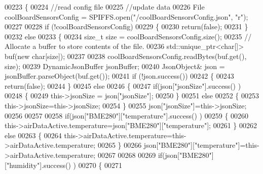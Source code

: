 \begin{DoxyCode}
00223 \{
00224     \textcolor{comment}{//read config file}
00225     \textcolor{comment}{//update data}
00226     File coolBoardSensorsConfig = SPIFFS.open(\textcolor{stringliteral}{"/coolBoardSensorsConfig.json"}, \textcolor{stringliteral}{"r"});
00227 
00228     \textcolor{keywordflow}{if} (!coolBoardSensorsConfig) 
00229     \{
00230         \textcolor{keywordflow}{return}(\textcolor{keyword}{false});
00231     \}
00232     \textcolor{keywordflow}{else}
00233     \{
00234         \textcolor{keywordtype}{size\_t} size = coolBoardSensorsConfig.size();
00235         \textcolor{comment}{// Allocate a buffer to store contents of the file.}
00236         std::unique\_ptr<char[]> buf(\textcolor{keyword}{new} \textcolor{keywordtype}{char}[size]);
00237 
00238         coolBoardSensorsConfig.readBytes(buf.get(), size);
00239         DynamicJsonBuffer jsonBuffer;
00240         JsonObject& json = jsonBuffer.parseObject(buf.get());
00241         \textcolor{keywordflow}{if} (!json.success()) 
00242         \{
00243               \textcolor{keywordflow}{return}(\textcolor{keyword}{false});
00244         \} 
00245         \textcolor{keywordflow}{else}
00246         \{     
00247             \textcolor{keywordflow}{if}(json[\textcolor{stringliteral}{"jsonSize"}].success() )
00248             \{
00249                 this->jsonSize = json[\textcolor{stringliteral}{"jsonSize"}]; 
00250             \}
00251             \textcolor{keywordflow}{else}
00252             \{
00253                 this->jsonSize=this->jsonSize;          
00254             \}
00255             json[\textcolor{stringliteral}{"jsonSize"}]=this->jsonSize;
00256 
00257             
00258             \textcolor{keywordflow}{if}(json[\textcolor{stringliteral}{"BME280"}][\textcolor{stringliteral}{"temperature"}].success() )
00259             \{           
00260                 this->airDataActive.temperature=json[\textcolor{stringliteral}{"BME280"}][\textcolor{stringliteral}{"temperature"}];
00261             \}
00262             \textcolor{keywordflow}{else}
00263             \{
00264                 this->airDataActive.temperature=this->airDataActive.temperature;            
00265             \}
00266             json[\textcolor{stringliteral}{"BME280"}][\textcolor{stringliteral}{"temperature"}]=this->airDataActive.temperature;
00267             
00268             
00269             \textcolor{keywordflow}{if}(json[\textcolor{stringliteral}{"BME280"}][\textcolor{stringliteral}{"humidity"}].success() )
00270             \{           
00271             

\end{DoxyCode}
